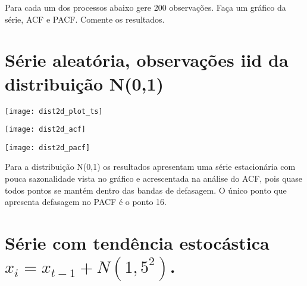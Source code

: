 Para cada um dos processos abaixo gere 200 observações. Faça um gráfico da série, ACF e PACF. Comente os resultados.

\section{Série aleatória, observações iid da distribuição N(0,1)}


\begin{center}
\begin{centering}
\texttt{[image: dist2d\_plot\_ts]}
\par\end{centering}
\par\end{center}

\begin{center}
\begin{centering}
\texttt{[image: dist2d\_acf]}
\par\end{centering}
\par\end{center}

\begin{center}
\begin{centering}
\texttt{[image: dist2d\_pacf]}
\par\end{centering}
\par\end{center}

Para a distribuição N(0,1) os resultados apresentam uma série estacionária com pouca sazonalidade vista no gráfico e acrescentada na análise do ACF, pois quase todos pontos se mantém dentro das bandas de defasagem. O único ponto que apresenta defasagem no PACF é o ponto 16.



\section{Série com tendência estocástica $x_{i}=x_{t-1}+N(1,5^{2})$.}

